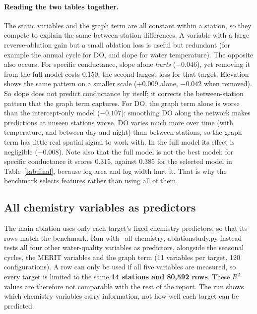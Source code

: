 \documentclass[11pt]{article}
\newcommand{\codeus}{\textunderscore\allowbreak}
\newcommand{\code}[1]{{\ttfamily\let\_\codeus #1}}
\begin{document}
\paragraph{Reading the two tables together.} The static variables and the graph term are all constant
within a station, so they compete to explain the same between-station differences. A variable with a
large reverse-ablation gain but a small ablation loss is useful but redundant (for example the annual
cycle for DO, and slope for water temperature). The opposite also occurs. For specific conductance,
slope alone \emph{hurts} ($-0.046$), yet removing it from the full model costs $0.150$, the
second-largest loss for that target. Elevation shows the same pattern on a smaller scale ($+0.009$
alone, $-0.042$ when removed). So slope does not predict conductance by itself; it corrects the
between-station pattern that the graph term captures. For DO, the graph term alone is worse than the
intercept-only model ($-0.107$): smoothing DO along the network makes predictions at unseen stations
worse. DO varies much more over time (with temperature, and between day and night) than between
stations, so the graph term has little real spatial signal to work with. In the full model its effect
is negligible ($-0.008$). Note also that the full model is not the best model:
for specific conductance it scores $0.315$, against $0.385$ for the selected model in
Table~\ref{tab:final}, because log area and log width hurt it. That is why the benchmark selects
features rather than using all of them.

\subsection{All chemistry variables as predictors}
\label{sec:allchem}

The main ablation uses only each target's fixed chemistry predictors, so that its rows match the
benchmark. Run with \code{--all-chemistry}, \code{ablation\_study.py} instead tests all four other
water-quality variables as predictors, alongside the seasonal cycles, the MERIT variables and the graph
term (11 variables per target, 120 configurations). A row can only be used if all five variables are
measured, so every target is limited to the same \textbf{14 stations and 80{,}592 rows}. These $R^2$
values are therefore not comparable with the rest of the report. The run shows which chemistry
variables carry information, not how well each target can be predicted.
\end{document}
